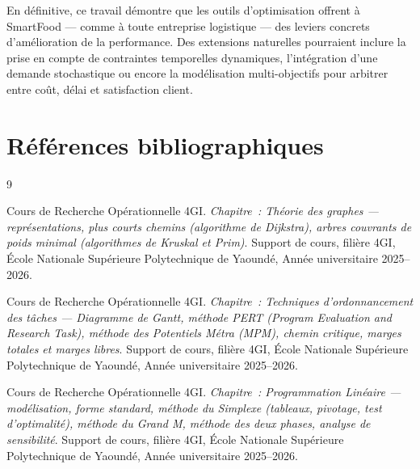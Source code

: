 \documentclass[12pt,a4paper]{article}
\begin{document}
En définitive, ce travail démontre que les outils d'optimisation offrent à SmartFood —
comme à toute entreprise logistique — des leviers concrets d'amélioration de la
performance. Des extensions naturelles pourraient inclure la prise en compte de
contraintes temporelles dynamiques, l'intégration d'une demande stochastique ou encore
la modélisation multi-objectifs pour arbitrer entre coût, délai et satisfaction client.



\newpage
\section*{Références bibliographiques}

\renewcommand{\refname}{}
\vspace{-1.8em}
\begin{thebibliography}{9}

Cours de Recherche Opérationnelle 4GI.
\textit{Chapitre~: Théorie des graphes --- représentations, plus courts
chemins (algorithme de Dijkstra), arbres couvrants de poids minimal
(algorithmes de Kruskal et Prim)}.
Support de cours, filière 4GI,
École Nationale Supérieure Polytechnique de Yaoundé,
Année universitaire 2025--2026.

Cours de Recherche Opérationnelle 4GI.
\textit{Chapitre~: Techniques d'ordonnancement des tâches ---
Diagramme de Gantt, méthode PERT (\emph{Program Evaluation and Research
Task}), méthode des Potentiels Métra (MPM), chemin critique, marges
totales et marges libres}.
Support de cours, filière 4GI,
École Nationale Supérieure Polytechnique de Yaoundé,
Année universitaire 2025--2026.

Cours de Recherche Opérationnelle 4GI.
\textit{Chapitre~: Programmation Linéaire --- modélisation, forme
standard, méthode du Simplexe (tableaux, pivotage, test d'optimalité),
méthode du Grand M, méthode des deux phases, analyse de sensibilité}.
Support de cours, filière 4GI,
École Nationale Supérieure Polytechnique de Yaoundé,
Année universitaire 2025--2026.

\end{thebibliography}

\newpage

\appendix
\end{document}
